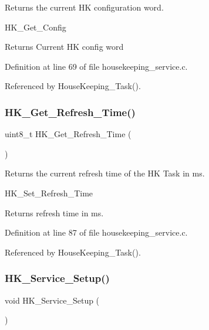 Returns the current HK configuration word. 

H\+K\+\_\+\+Get\+\_\+\+Config

\begin{DoxyReturn}{Returns}
Current HK config word 
\end{DoxyReturn}


Definition at line 69 of file housekeeping\+\_\+service.\+c.



Referenced by House\+Keeping\+\_\+\+Task().

\mbox{\label{group___h_k___service_ga302ac334855fd8caa8f08bdb8ccd14d8}} 
\subsubsection{\texorpdfstring{H\+K\+\_\+\+Get\+\_\+\+Refresh\+\_\+\+Time()}{HK\_Get\_Refresh\_Time()}}
{\footnotesize\ttfamily uint8\+\_\+t H\+K\+\_\+\+Get\+\_\+\+Refresh\+\_\+\+Time (\begin{DoxyParamCaption}{ }\end{DoxyParamCaption})}



Returns the current refresh time of the HK Task in ms. 

H\+K\+\_\+\+Set\+\_\+\+Refresh\+\_\+\+Time \begin{DoxyReturn}{Returns}
refresh time in ms. 
\end{DoxyReturn}


Definition at line 87 of file housekeeping\+\_\+service.\+c.



Referenced by House\+Keeping\+\_\+\+Task().

\mbox{\label{group___h_k___service_gac59d791680b33dd9ce060d6cd1c8d503}} 
\subsubsection{\texorpdfstring{H\+K\+\_\+\+Service\+\_\+\+Setup()}{HK\_Service\_Setup()}}
{\footnotesize\ttfamily void H\+K\+\_\+\+Service\+\_\+\+Setup (\begin{DoxyParamCaption}{ }\end{DoxyParamCaption})}




